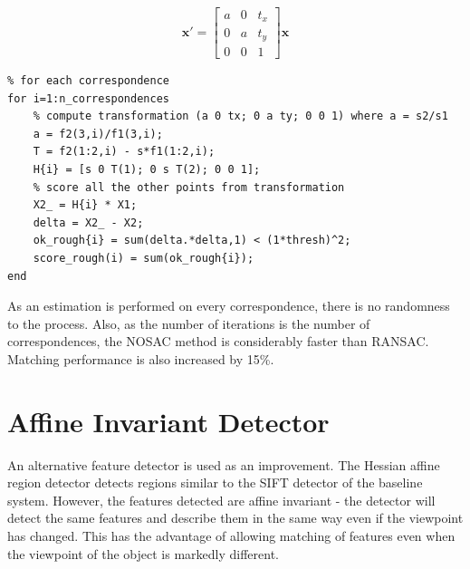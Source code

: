 \documentclass[11pt, onecolumn, a4paper, final]{report} %
\begin{document}
\begin{equation}
\mathbf{x'}=
\left[ \begin{array}{ccc}
a & 0 & t_x \\
0 & a & t_y \\
0 & 0 & 1
\end{array}\right]\mathbf{x}
\label{eqn:scaleaffine}
\end{equation} 

\linespread{1} %
\lstset{language=Matlab,caption=Estimating the pure scale affine transformation for each corresponding feature.,label=lst:nosac}
\begin{lstlisting}[frame=single]
%% MATLAB
% for each correspondence
for i=1:n_correspondences
    % compute transformation (a 0 tx; 0 a ty; 0 0 1) where a = s2/s1
    a = f2(3,i)/f1(3,i);
    T = f2(1:2,i) - s*f1(1:2,i);
    H{i} = [s 0 T(1); 0 s T(2); 0 0 1]; 
    % score all the other points from transformation
    X2_ = H{i} * X1;
    delta = X2_ - X2;
    ok_rough{i} = sum(delta.*delta,1) < (1*thresh)^2;
    score_rough(i) = sum(ok_rough{i});
end\end{lstlisting}
\linespread{2} %

As an estimation is performed on every correspondence, there is no randomness to the process. Also, as the number of iterations is the number of correspondences, the NOSAC method is considerably faster than RANSAC. Matching performance is also increased by 15\%.

\section{Affine Invariant Detector}
\label{sec:affine}
An alternative feature detector is used as an improvement. The Hessian affine region detector detects regions similar to the SIFT detector of the baseline system. However, the features detected are affine invariant - the detector will detect the same features and describe them in the same way even if the viewpoint has changed. This has the advantage of allowing matching of features even when the viewpoint of the object is markedly different.
\end{document}

